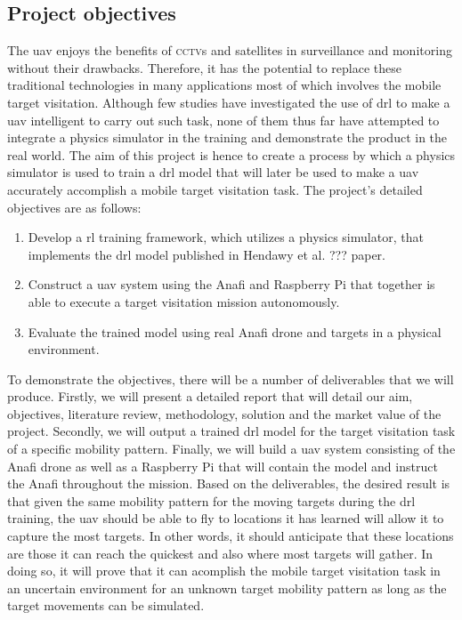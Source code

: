 \documentclass[../main.tex]{subfiles}
\begin{document}

\blindtext

\subsection{Project objectives}

The \gls{uav} enjoys the benefits of \textsc{cctv}s and satellites
in surveillance and monitoring without their drawbacks.
Therefore, it has the potential to replace these
traditional technologies in many applications 
most of which involves the mobile target visitation. 
Although few studies have investigated the use of \gls{drl}
to make a \gls{uav} intelligent to carry out such task,
none of them thus far have attempted to
integrate a physics simulator in the training
and demonstrate the product in the real world.
The aim of this project is hence to create a process 
by which a physics simulator is used to train 
a \gls{drl} model that will later be used
to make a \gls{uav} accurately accomplish a
mobile target visitation task.
The project's detailed objectives are as follows:

\begin{enumerate}
    \item Develop a \gls{rl} training framework,
        which utilizes a physics simulator, 
        that implements the \gls{drl} model 
        published in Hendawy et al. ??? paper.
    \item Construct a \gls{uav} system using the Anafi and 
        Raspberry Pi that together is able to execute
        a target visitation mission autonomously.
    \item Evaluate the trained model using real Anafi drone
        and targets in a physical environment.
\end{enumerate}

To demonstrate the objectives, there will be a number 
of deliverables that we will produce.
Firstly, we will present a detailed report that will detail
our aim, objectives, literature review, methodology,
solution and the market value of the project.
Secondly, we will output a trained \gls{drl} model for 
the target visitation task of a specific
mobility pattern.
Finally, we will build a \gls{uav} system
consisting of the Anafi drone as well as a Raspberry Pi
that will contain the model and instruct
the Anafi throughout the mission.
Based on the deliverables, the desired result is that
given the same mobility pattern for 
the moving targets during the \gls{drl} training,
the \gls{uav} should be able to fly to locations it has learned
will allow it to capture the most targets. In other words,
it should anticipate that these locations are those it can reach
the quickest and also where most targets will gather.
In doing so, it will prove that it can acomplish 
the mobile target visitation task in an uncertain environment
for an unknown target mobility pattern
as long as the target movements can be simulated.

\blindtext
\end{document}
